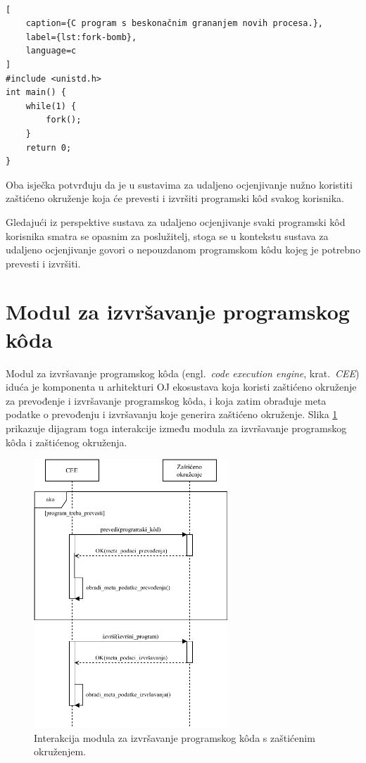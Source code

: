 \documentclass[times, utf8, diplomski]{fer}
\begin{document}
\

\begin{lstlisting}[
    caption={C program s beskonačnim grananjem novih procesa.},
    label={lst:fork-bomb},
    language=c
]
#include <unistd.h>
int main() {
    while(1) {
        fork();
    }
    return 0;
}
\end{lstlisting}

Oba isječka potvrđuju da je u sustavima za udaljeno ocjenjivanje nužno koristiti zaštićeno okruženje koja će prevesti i izvršiti programski kôd svakog korisnika. 

Gledajući iz perspektive sustava za udaljeno ocjenjivanje svaki programski kôd korisnika smatra se opasnim za poslužitelj, stoga se u kontekstu sustava za udaljeno ocjenjivanje govori o nepouzdanom programskom kôdu  kojeg je potrebno prevesti i izvršiti.

\section{Modul za izvršavanje programskog kôda}
Modul za izvršavanje programskog kôda (engl.\ \textit{code execution engine}, krat.\ \textit{CEE}) iduća je komponenta u arhitekturi OJ ekosustava koja koristi zaštićeno okruženje za prevođenje i izvršavanje programskog kôda, i koja zatim obrađuje meta podatke o prevođenju i izvršavanju koje generira zaštićeno okruženje. Slika \ref{fig:cee-and-sandbox} prikazuje dijagram toga interakcije između modula za izvršavanje programskog kôda i zaštićenog okruženja.

\begin{figure}[htb]
	\centering
	\includegraphics[width=0.65\textwidth]{images/CEE i zaštićeno okruženje.pdf}
	\caption{
		Interakcija modula za izvršavanje programskog kôda s zaštićenim okruženjem.
	}
	\label{fig:cee-and-sandbox}
\end{figure}
\end{document}
